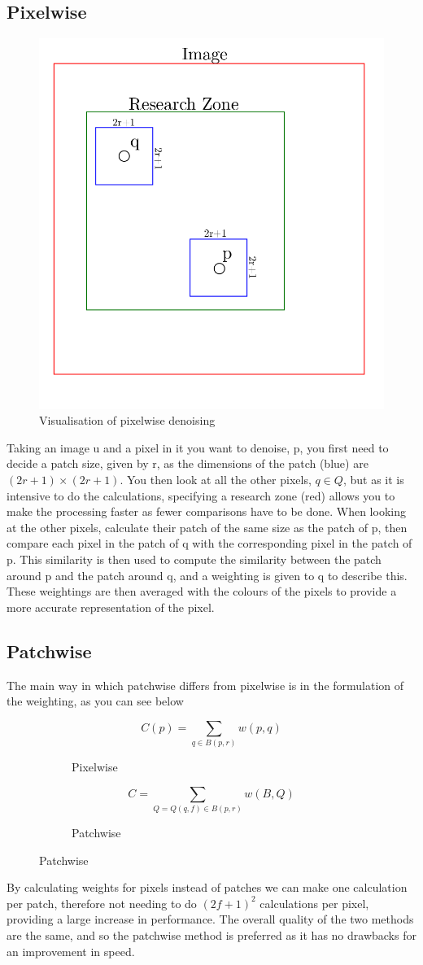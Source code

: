 \documentclass[11pt]{article}
\begin{document}
\subsection{Pixelwise}
\begin{figure}[H]
\begin{center}
	\includegraphics[width=0.3\linewidth]{drawing}
\end{center}
\caption{Visualisation of pixelwise denoising}
\end{figure}
\cite{buades_non-local_2011}Taking an image u and a pixel in it you want to denoise, p, you first need to decide a patch size, given by r, as the dimensions of the patch (blue) are $(2r+1)\times(2r+1)$. You then look at all the other pixels, $q\in Q$, but as it is intensive to do the calculations, specifying a research zone (red) allows you to make the processing faster as fewer comparisons have to be done. When looking at the other pixels, calculate their patch of the same size as the patch of p, then compare each pixel in the patch of q with the corresponding pixel in the patch of p. This similarity is then used to compute the similarity between the patch around p and the patch around q, and a weighting is given to q to describe this. These weightings are then averaged with the colours of the pixels to provide a more accurate representation of the pixel.


\subsection{Patchwise}
\cite{buades_non-local_2011} The main way in which patchwise differs from pixelwise is in the formulation of the weighting, as you can see below
\begin{figure}[H]
	\centering
	\begin{subfigure}{.45\textwidth}
		\centering
		$$C(p)=\sum_{q \in B(p, r)} w(p, q)$$
		\caption{Pixelwise}
		\label{fig:pixelwise}
	\end{subfigure}%
	\begin{subfigure}{.45\textwidth}
		\centering
		$$
		C=\sum_{Q=Q(q, f) \in B(p, r)} w(B, Q)
		$$
		\caption{Patchwise}
		\label{fig:patchwise}
	\end{subfigure}
\end{figure}
By calculating weights for pixels instead of patches we can make one calculation per patch, therefore not needing to do $(2f+1)^2$ calculations per pixel, providing a large increase in performance. The overall quality of the two methods are the same, and so the patchwise method is preferred as it has no drawbacks for an improvement in speed.
\end{document}
